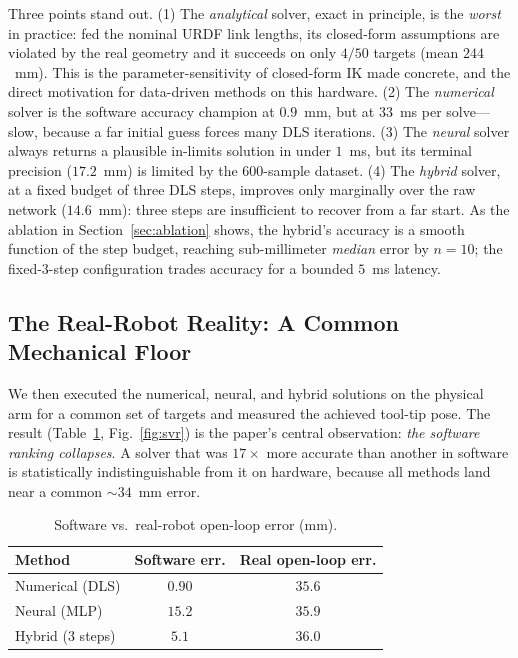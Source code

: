\documentclass[conference]{IEEEtran}
\begin{document}
Three points stand out. (1) The \emph{analytical} solver, exact in principle, is the \emph{worst} in practice: fed the nominal URDF link lengths, its closed-form assumptions are violated by the real geometry and it succeeds on only $4/50$ targets (mean $244$~mm). This is the parameter-sensitivity of closed-form IK made concrete, and the direct motivation for data-driven methods on this hardware. (2) The \emph{numerical} solver is the software accuracy champion at $0.9$~mm, but at $33$~ms per solve---slow, because a far initial guess forces many DLS iterations. (3) The \emph{neural} solver always returns a plausible in-limits solution in under $1$~ms, but its terminal precision ($17.2$~mm) is limited by the $600$-sample dataset. (4) The \emph{hybrid} solver, at a fixed budget of three DLS steps, improves only marginally over the raw network ($14.6$~mm): three steps are insufficient to recover from a far start. As the ablation in Section~\ref{sec:ablation} shows, the hybrid's accuracy is a smooth function of the step budget, reaching sub-millimeter \emph{median} error by $n{=}10$; the fixed-3-step configuration trades accuracy for a bounded $5$~ms latency.

\subsection{The Real-Robot Reality: A Common Mechanical Floor}
\label{sec:realfloor}

We then executed the numerical, neural, and hybrid solutions on the physical arm for a common set of targets and measured the achieved tool-tip pose. The result (Table~\ref{tab:real}, Fig.~\ref{fig:svr}) is the paper's central observation: \emph{the software ranking collapses}. A solver that was $17\times$ more accurate than another in software is statistically indistinguishable from it on hardware, because all methods land near a common $\sim\!34$~mm error.

\begin{table}[t]
\centering
\caption{Software vs.\ real-robot open-loop error (mm).}
\label{tab:real}
\begin{tabular}{lcc}
\toprule
\textbf{Method} & \textbf{Software err.} & \textbf{Real open-loop err.} \\
\midrule
Numerical (DLS) & $0.90$ & $35.6$ \\
Neural (MLP) & $15.2$ & $35.9$ \\
Hybrid ($3$ steps) & $5.1$ & $36.0$ \\
\bottomrule
\end{tabular}
\end{table}
\end{document}

